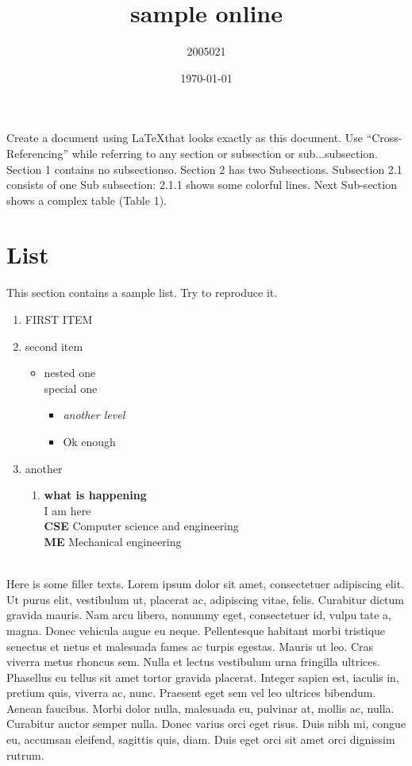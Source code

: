\documentclass{article}
\title{sample online}
\author{2005021 }
\date{\today}
\begin{document}
\maketitle

Create a document using \LaTeX that looks exactly as this document. Use
“Cross-Referencing” while referring to any section or subsection or sub...subsection.
Section 1 contains no subsectionso. Section 2 has two Subsections. Subsection
2.1 consists of one Sub subsection: 2.1.1 shows some colorful lines. Next Sub-section shows a complex table (Table 1).

\section{List}
This section contains a sample list. Try to reproduce it.
\begin{enumerate}
    \item FIRST ITEM
    \item second item
    \begin{itemize}
        \item nested one \\
        special one
        \begin{itemize}
            \item \textit{another level}
            \item Ok enough
        \end{itemize}
    \end{itemize}
    \item another
    \begin{enumerate}
        \item \textbf{what is happening}\\
        I am here\\
        \textbf{CSE} Computer science and engineering \\
        \textbf{ME} Mechanical engineering \\
    \end{enumerate}
\end{enumerate}\\

Here is some filler texts. Lorem ipsum dolor sit amet, consectetuer adipiscing
elit. Ut purus elit, vestibulum ut, placerat ac, adipiscing vitae, felis. Curabitur
dictum gravida mauris. Nam arcu libero, nonummy eget, consectetuer id, vulputate a, magna. Donec vehicula augue eu neque. Pellentesque habitant morbi
tristique senectus et netus et malesuada fames ac turpis egestas. Mauris ut
leo. Cras viverra metus rhoncus sem. Nulla et lectus vestibulum urna fringilla
ultrices. Phasellus eu tellus sit amet tortor gravida placerat. Integer sapien
est, iaculis in, pretium quis, viverra ac, nunc. Praesent eget sem vel leo ultrices bibendum. Aenean faucibus. Morbi dolor nulla, malesuada eu, pulvinar at,
mollis ac, nulla. Curabitur auctor semper nulla. Donec varius orci eget risus.
Duis nibh mi, congue eu, accumsan eleifend, sagittis quis, diam. Duis eget orci
sit amet orci dignissim rutrum.
\end{document}
